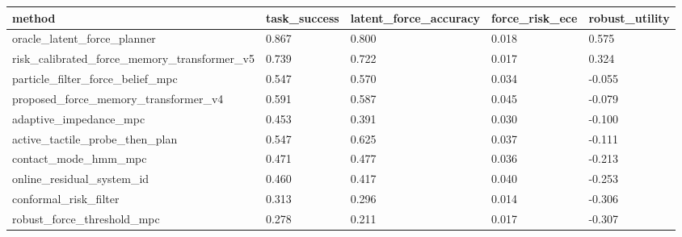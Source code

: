 \begin{tabular}{lllll}
\toprule
method & task\_success & latent\_force\_accuracy & force\_risk\_ece & robust\_utility \\
\midrule
oracle\_latent\_force\_planner & 0.867 & 0.800 & 0.018 & 0.575 \\
risk\_calibrated\_force\_memory\_transformer\_v5 & 0.739 & 0.722 & 0.017 & 0.324 \\
particle\_filter\_force\_belief\_mpc & 0.547 & 0.570 & 0.034 & -0.055 \\
proposed\_force\_memory\_transformer\_v4 & 0.591 & 0.587 & 0.045 & -0.079 \\
adaptive\_impedance\_mpc & 0.453 & 0.391 & 0.030 & -0.100 \\
active\_tactile\_probe\_then\_plan & 0.547 & 0.625 & 0.037 & -0.111 \\
contact\_mode\_hmm\_mpc & 0.471 & 0.477 & 0.036 & -0.213 \\
online\_residual\_system\_id & 0.460 & 0.417 & 0.040 & -0.253 \\
conformal\_risk\_filter & 0.313 & 0.296 & 0.014 & -0.306 \\
robust\_force\_threshold\_mpc & 0.278 & 0.211 & 0.017 & -0.307 \\
\bottomrule
\end{tabular}
